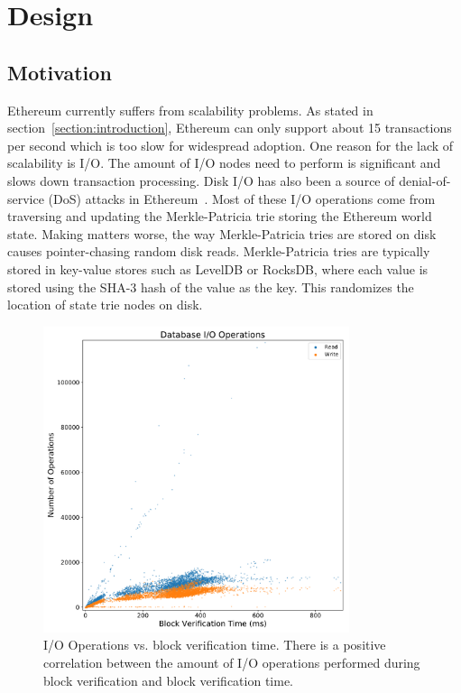 \documentclass[12pt]{article}
\newcommand{\figurewidth}{0.8\textwidth}
\begin{document}

\section{Design}

\subsection{Motivation}


Ethereum currently suffers from scalability problems. As stated in section~\ref{section:introduction}, Ethereum can only support about 15 transactions per second which is too slow for widespread adoption. One reason for the lack of scalability is I/O. The amount of I/O nodes need to perform is significant and slows down transaction processing. Disk I/O has also been a source of denial-of-service (DoS) attacks in Ethereum~\cite{statelessclients}. Most of these I/O operations come from traversing and updating the Merkle-Patricia trie storing the Ethereum world state. Making matters worse, the way Merkle-Patricia tries are stored on disk causes pointer-chasing random disk reads. Merkle-Patricia tries are typically stored in key-value stores such as LevelDB or RocksDB, where each value is stored using the SHA-3 hash of the value as the key. This randomizes the location of state trie nodes on disk.

\begin{figure}[H]
  \centering
  \includegraphics[width=\figurewidth]{../figures/results/graphs/background/db-io-ops-elapsed.pdf}
  \caption{I/O Operations vs. block verification time. There is a positive correlation between the amount of I/O operations performed during block verification and block verification time.}
  \label{fig:blockverificationtime}
\end{figure}
\end{document}
